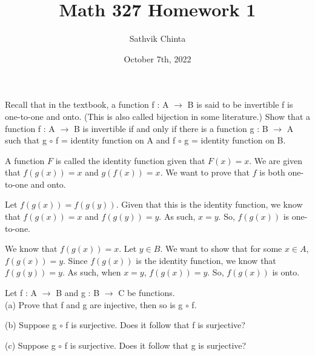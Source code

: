\documentclass[addpoints]{exam}
\title{Math 327 Homework 1}
\author{Sathvik Chinta}
\date{October 7th, 2022}
\begin{document}
\maketitle

\begin{questions}
\question Recall that in the textbook, a function f : A $\rightarrow$ B is said to be
invertible f is one-to-one and onto. (This is also called bijection in some literature.)
Show that a function f : A $\rightarrow$ B is invertible if and only if there is a function g :
B $\rightarrow$ A such that g $\circ$ f = identity function on A and f $\circ$ g = identity 
function on B.

A function $F$ is called the identity function given that $F(x) = x$. We are given that $f(g(x)) 
= x$ and $g(f(x)) = x$. We want to prove that $f$ is both one-to-one and onto. 

Let $f(g(x)) = f(g(y))$. Given that this is the identity function, we know that $f(g(x)) = x$ 
and $f(g(y)) = y$. As such, $x = y$. So, $f(g(x))$ is one-to-one. 

We know that $f(g(x)) = x$. Let $y \in B$. We want to show that for some $x \in A$, $f(g(x)) = y$.
Since $f(g(x))$ is the identity function, we know that $f(g(y)) = y$. As such, when $x = y$, 
$f(g(x)) = y$. So, $f(g(x))$ is onto.

\question Let f : A $\rightarrow$ B and g : B $\rightarrow$ C be functions.\\
(a) Prove that f and g are injective, then so is g $\circ$ f. 

(b) Suppose g $\circ$ f is surjective. Does it follow that f is surjective?

(c) Suppose g $\circ$ f is surjective. Does it follow that g is surjective?

\end{questions}
\end{document}
